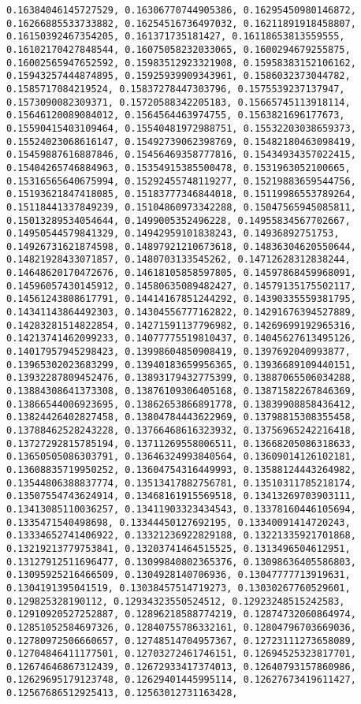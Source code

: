 \documentclass[11pt]{article}
\begin{document}
\begin{Verbatim}[commandchars=\\\{\}]
0.16384046145727529, 0.16306770744905386, 0.16295450980146872, 0.16266885533733882, 0.16254516736497032, 0.16211891918458807, 0.16150392467354205, 0.161371735181427, 0.16118653813559555, 0.16102170427848544, 0.16075058232033065, 0.1600294679255875, 0.16002565947652592, 0.15983512923321908, 0.15958383152106162, 0.15943257444874895, 0.15925939909343961, 0.1586032373044782, 0.1585717084219524, 0.15837278447303796, 0.1575539237137947, 0.1573090082309371, 0.15720588342205183, 0.15665745113918114, 0.15646120089084012, 0.1564564463974755, 0.1563821696177673, 0.15590415403109464, 0.15540481972988751, 0.15532203038659373, 0.15524023068616147, 0.15492739062398769, 0.15482180463098419, 0.15459887616887846, 0.15456469358777816, 0.15434934357022415, 0.15404265746884963, 0.15354915385500478, 0.1531963052100665, 0.15316565640675994, 0.15292455748119277, 0.15219883659544756, 0.15193621847418085, 0.15183777346844018, 0.15119986553789264, 0.15118441337849239, 0.15104860973342288, 0.15047565945085811, 0.15013289534054644, 0.1499005352496228, 0.14955834567702667, 0.14950544579841329, 0.14942959101838243, 0.14936892751753, 0.14926731621874598, 0.14897921210673618, 0.14836304620550644, 0.14821928433071857, 0.1480703133545262, 0.14712628312838244, 0.14648620170472676, 0.14618105858597805, 0.14597868459968091, 0.14596057430145912, 0.14580635089482427, 0.14579135175502117, 0.14561243808617791, 0.14414167851244292, 0.14390335559381795, 0.14341143864492303, 0.14304556777162822, 0.14291676394527889, 0.14283281514822854, 0.14271591137796982, 0.14269699192965316, 0.14213741462099233, 0.14077775519810437, 0.14045627613495126, 0.14017957945298423, 0.13998604850908419, 0.1397692040993877, 0.13965302023683299, 0.13940183659956365, 0.13936689109440151, 0.13932287809452476, 0.13893179432775399, 0.13887065506034288, 0.13884308641373308, 0.13876109306405168, 0.13871582267846369, 0.13866544006923695, 0.13862653866891778, 0.13839908858436412, 0.13824426402827458, 0.13804784443622969, 0.13798815308355458, 0.13788462528243228, 0.13766468616323932, 0.13756965242216418, 0.13727292815785194, 0.13711269558006511, 0.13668205086318633, 0.13650505086303791, 0.13646324993840564, 0.13609014126102181, 0.13608835719950252, 0.13604754316449993, 0.13588124443264982, 0.13544806388837774, 0.13513417882756781, 0.13510311785218174, 0.13507554743624914, 0.13468161915569518, 0.13413269703903111, 0.13413085110036257, 0.13411903323434543, 0.13378160446105694, 0.1335471540498698, 0.13344450127692195, 0.13340091414720243, 0.13334652741406922, 0.13321236922829188, 0.13221335921701868, 0.13219213779753841, 0.13203741464515525, 0.1313496504612951, 0.13127912511696477, 0.13099840802365376, 0.13098636405586803, 0.13095925216466509, 0.1304928140706936, 0.13047777713919631, 0.1304191395041519, 0.13038457514719273, 0.13030267760529601, 0.129825328190112, 0.12934323550524512, 0.12923248515242583, 0.12910920527252887, 0.12896218588774219, 0.12874732060864974, 0.12851052584697326, 0.12840755786332161, 0.12804796703669036, 0.12780972506660657, 0.12748514704957367, 0.12723111273658089, 0.12704846411177501, 0.12703272461746151, 0.12694525323817701, 0.12674646867312439, 0.12672933417374013, 0.12640793157860986, 0.12629695179123748, 0.12629401445995114, 0.12627673419611427, 0.12567686512925413, 0.12563012731163428, 
\end{Verbatim}
\end{document}

